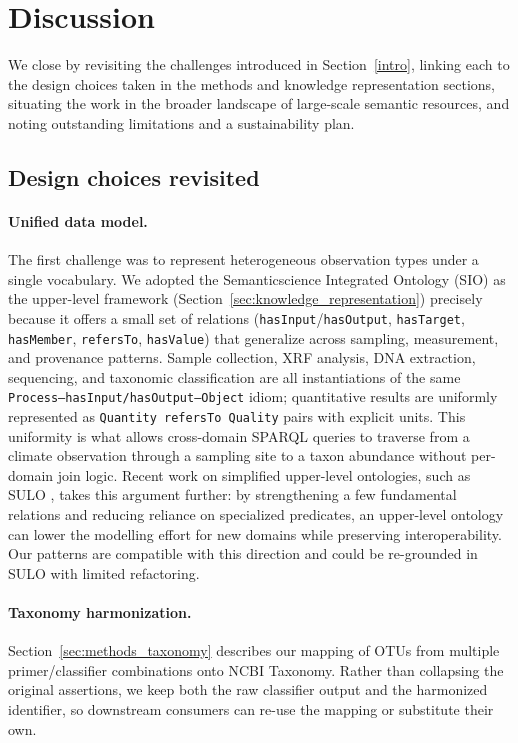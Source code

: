 \section{Discussion}\label{sec:discussion}

We close by revisiting the challenges introduced in
Section~\ref{intro}, linking each to the design choices taken in
the methods and knowledge representation sections, situating the
work in the broader landscape of large-scale semantic resources,
and noting outstanding limitations and a sustainability plan.

\subsection{Design choices revisited}

\paragraph{Unified data model.} The first challenge was to represent
heterogeneous observation types under a single vocabulary. We adopted
the Semanticscience Integrated Ontology (SIO) as the upper-level
framework (Section~\ref{sec:knowledge_representation}) precisely
because it offers a small set of relations
(\texttt{hasInput}/\texttt{hasOutput}, \texttt{hasTarget},
\texttt{hasMember}, \texttt{refersTo}, \texttt{hasValue}) that
generalize across sampling, measurement, and provenance patterns.
Sample collection, XRF analysis, DNA extraction, sequencing, and
taxonomic classification are all instantiations of the same
\texttt{Process--hasInput/hasOutput--Object} idiom; quantitative
results are uniformly represented as \texttt{Quantity refersTo
Quality} pairs with explicit units. This uniformity is what allows
cross-domain SPARQL queries to traverse from a climate observation
through a sampling site to a taxon abundance without per-domain
join logic. Recent work on simplified upper-level ontologies, such as SULO
\cite{sulo2025}, takes this argument further: by strengthening a few
fundamental relations and reducing reliance on specialized
predicates, an upper-level ontology can lower the modelling effort
for new domains while preserving interoperability. Our patterns are
compatible with this direction and could be re-grounded in SULO with
limited refactoring.

\paragraph{Taxonomy harmonization.} Section~\ref{sec:methods_taxonomy}
describes our mapping of OTUs from multiple primer/classifier
combinations onto NCBI Taxonomy. Rather than collapsing the
original assertions, we keep both the raw classifier output and
the harmonized identifier, so downstream consumers can re-use the
mapping or substitute their own.

